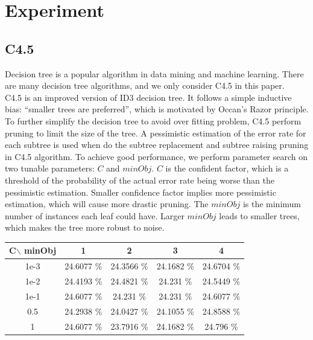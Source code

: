 \documentclass[a4paper,11pt]{nurop}
\begin{document}
\section{Experiment}
\subsection{C4.5}
Decision tree is a popular algorithm in data mining and machine learning. There are many decision tree algorithms, and we only consider C4.5 in this paper.\\
C4.5 is an improved version of ID3 decision tree. It follows a simple inductive bias: ``smaller trees are preferred'', which is motivated by Occan's Razor principle. To further simplify the decision tree to avoid over fitting problem, C4.5 perform pruning to limit the size of the tree. A pessimistic estimation of the error rate for each subtree is used when do the subtree replacement and subtree raising pruning in C4.5 algorithm. To achieve good performance, we perform parameter search on two tunable parameters: $C$ and $minObj$. $C$ is the confident factor, which is a threshold of the probability of the actual error rate being worse than the pessimistic estimation\cite{morgan.kaufmann}. Smaller confidence factor implies more pessimistic estimation, which will cause more drastic pruning. The $minObj$ is the minimum number of instances each leaf could have. Larger $minObj$ leads to smaller trees, which makes the tree more robust to noise.
\vspace{0.5cm}\\
\begin{tabular}{c|c c c c}
C$\backslash$ minObj	&1		&2		&3		&4\\
\hline \hline
1e-3 	&24.6077 \%	&24.3566 \%	&24.1682 \%	 &24.6704 \%\\
1e-2	&24.4193 \%	 &24.4821 \%	&24.231  \%	 &24.5449 \%\\
1e-1	&24.6077 \%	&24.231  \%	&24.231  \%	 &24.6077 \%\\
0.5 &24.2938 \%     &24.0427 \% &24.1055 \%  &24.8588 \%\\
1	&24.6077 \%	    &23.7916 \%	&24.1682 \%	 &24.796  \%\\
\end{tabular}
\vspace{0.5cm}\\
\end{document}
